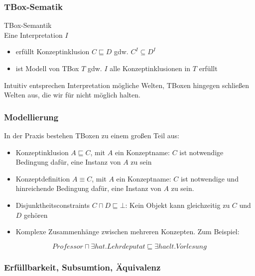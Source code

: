 \subsubsection{TBox-Sematik}\label{tboxsemantik}

\begin{definition}{TBox-Semantik} \\
Eine Interpretation $I$
\begin{itemize}
\item
  erfüllt Konzeptinklusion $C \sqsubseteq D$ gdw.
  $C^{I} \subseteq D^{I}$
\item
  ist Modell von TBox $T$ gdw. $I$ alle Konzeptinklusionen in $T$
  erfüllt
\end{itemize}
\end{definition}

Intuitiv entsprechen Interpretation mögliche Welten, TBoxen hingegen schließen Welten aus, die wir für nicht möglich halten.

\subsubsection{Modellierung}\label{modellierung}

In der Praxis bestehen TBoxen zu einem großen Teil aus:

\begin{itemize}
\item Konzeptinklusion $A \sqsubseteq C$, mit $A$ ein Konzeptname: $C$ ist notwendige Bedingung dafür, eine Instanz von $A$ zu sein
\item Konzeptdefinition $A \equiv C$, mit $A$ ein Konzeptname: $C$ ist notwendige und hinreichende Bedingung dafür, eine Instanz von $A$ zu sein.
\item Disjunktheitsconstraints $C \sqcap D \sqsubseteq \bot$: Kein Objekt kann gleichzeitig zu $C$ und $D$ gehören
\item Komplexe Zusammenhänge zwischen mehreren Konzepten. Zum Beispiel:
\end{itemize}

$$Professor \sqcap \exists hat.Lehrdeputat \sqsubseteq \exists haelt.Vorlesung$$

\subsubsection{Erfüllbarkeit, Subsumtion, Äquivalenz}\label{erfuxfcllbarkeit-subsumtion-uxe4quivalenz-1}

